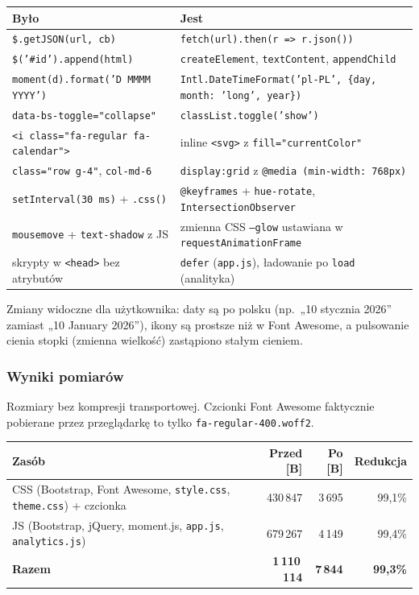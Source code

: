 \begin{tablehere}
\centering
\begin{tabular}{l p{9cm}}
\toprule
\textbf{Było} & \textbf{Jest} \\
\midrule
\texttt{\$.getJSON(url, cb)} & \texttt{fetch(url).then(r => r.json())} \\
\texttt{\$('\#id').append(html)} & \texttt{createElement}, \texttt{textContent}, \texttt{appendChild} \\
\texttt{moment(d).format('D MMMM YYYY')} & \texttt{Intl.DateTimeFormat('pl-PL', \{day, month: 'long', year\})} \\
\texttt{data-bs-toggle="collapse"} & \texttt{classList.toggle('show')} \\
\texttt{<i class="fa-regular fa-calendar">} & inline \texttt{<svg>} z \texttt{fill="currentColor"} \\
\texttt{class="row g-4"}, \texttt{col-md-6} & \texttt{display:grid} z \texttt{@media (min-width: 768px)} \\
\texttt{setInterval(30 ms)} + \texttt{.css()} & \texttt{@keyframes} + \texttt{hue-rotate}, \texttt{IntersectionObserver} \\
\texttt{mousemove} + \texttt{text-shadow} z JS & zmienna CSS \texttt{--glow} ustawiana w \texttt{requestAnimationFrame} \\
skrypty w \texttt{<head>} bez atrybutów & \texttt{defer} (\texttt{app.js}), ładowanie po \texttt{load} (analityka) \\
\bottomrule
\end{tabular}
\caption{Zamienniki użytych funkcji}
\end{tablehere}

Zmiany widoczne dla użytkownika: daty są po polsku (np.\ „10 stycznia 2026” zamiast
„10 January 2026”), ikony są prostsze niż w Font Awesome, a pulsowanie cienia stopki
(zmienna wielkość) zastąpiono stałym cieniem.

\subsubsection{Wyniki pomiarów}

Rozmiary bez kompresji transportowej. Czcionki Font Awesome faktycznie pobierane
przez przeglądarkę to tylko \texttt{fa-regular-400.woff2}.

\begin{tablehere}
\centering
\begin{tabular}{l r r r}
\toprule
\textbf{Zasób} & \textbf{Przed [B]} & \textbf{Po [B]} & \textbf{Redukcja} \\
\midrule
CSS (Bootstrap, Font Awesome, \texttt{style.css}, \texttt{theme.css}) + czcionka & 430\,847 & 3\,695 & 99,1\% \\
JS (Bootstrap, jQuery, moment.js, \texttt{app.js}, \texttt{analytics.js}) & 679\,267 & 4\,149 & 99,4\% \\
\midrule
\textbf{Razem} & \textbf{1\,110\,114} & \textbf{7\,844} & \textbf{99,3\%} \\
\bottomrule
\end{tabular}
\caption{Rozmiary CSS, JS i czcionek przed i po optymalizacji}
\end{tablehere}

